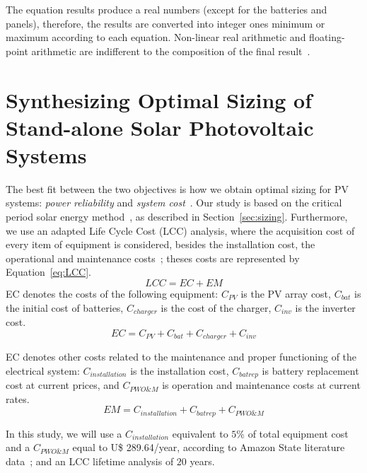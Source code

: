 \documentclass[review]{elsarticle}
\begin{document}
The equation results produce a real numbers (except for the batteries and panels), therefore, the results are converted into integer ones minimum or maximum according to each equation.  Non-linear real arithmetic and floating-point arithmetic are indifferent to the composition of the final result~\citep{DBLP:journals/corr/abs-2004-12699}.

\section{Synthesizing Optimal Sizing of Stand-alone Solar Photovoltaic Systems}
\label{sec:SynthesizingOptimalSolarPhotovoltaicSystems}
The best fit between the two objectives is how we obtain optimal sizing for PV systems: \textit{power reliability} and \textit{system cost}~\citep{Alsadi2018}. Our study is based on the critical period solar energy method~\citep{Pinho}, as described in Section~\ref{sec:sizing}. Furthermore, we use an adapted Life Cycle Cost (LCC) analysis, where the acquisition cost of every item of equipment is considered, besides the installation cost, the operational and maintenance costs~\citep{Alsadi2018}; theses costs are represented by Equation~\ref{eq:LCC}.
%
\begin{equation}
\label{eq:LCC}
LCC = EC + EM
\end{equation}
%
\noindent EC denotes the costs of the following equipment: $C_{PV}$ is the PV array cost, $C_{bat}$ is the initial cost of batteries, $C_{charger}$ is the cost of the charger, $C_{inv}$ is the inverter cost.
\begin{equation}
\label{eq:EquipamentCost}
EC = C_{PV} + C_{bat} + C_{charger} + C_{inv}
\end{equation}

EC denotes other costs related to the maintenance and proper functioning of the electrical system: $C_{installation}$ is the installation cost, $C_{batrep}$ is battery replacement cost at current prices, and $C_{PWO\&M}$ is operation and maintenance costs at current rates.
\begin{equation}
\label{eq:EquipamentMaintenence}
EM = C_{installation} + C_{batrep} + C_{PWO\&M}
\end{equation}

In this study, we will use a $C_{installation}$ equivalent to $5$\% of total equipment cost and a $C_{PWO\&M}$ equal to U\$ 289.64/year, according to Amazon State literature data~\citep{Agrener2013}; and an LCC lifetime analysis of $20$ years.
\end{document}
